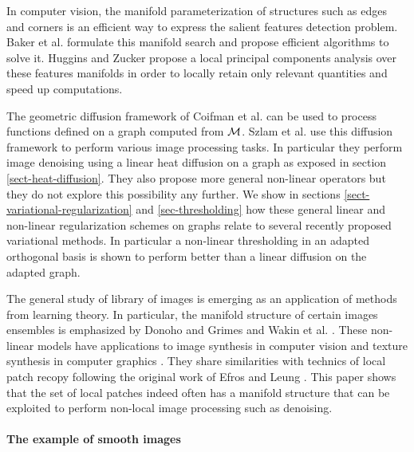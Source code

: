 \documentclass[final]{siamltex}
\begin{document}
In computer vision, the manifold parameterization of structures such as edges and corners is an efficient way to express the salient features detection  problem. Baker et al. \cite{baker-parametric} formulate this manifold search and propose efficient algorithms to solve it. Huggins and Zucker \cite{huggins-local-pca} propose a local principal components analysis over these features manifolds in order to locally retain only relevant quantities and speed up computations.

The geometric diffusion framework of Coifman et al. \cite{coifman-geometric-diffusion} can be used to process functions defined on a graph computed from $\mathcal{M}$. Szlam et al. \cite{szlam-regularization} use this diffusion framework to perform various image processing tasks. In particular they perform image denoising using a linear heat diffusion on a graph as exposed in section \ref{sect-heat-diffusion}. They also propose more general non-linear operators but they do not explore this possibility any further. We show in sections \ref{sect-variational-regularization} and \ref{sec-thresholding} how these general linear and non-linear regularization schemes on graphs relate to several recently proposed variational methods. In particular a non-linear thresholding in an adapted orthogonal basis is shown to perform better than a linear diffusion on the adapted graph.


The general study of library of images is emerging as an application of methods from learning theory. In particular, the manifold structure of certain images ensembles is emphasized by Donoho and Grimes \cite{donoho-isomap} and Wakin et al. \cite{wakin-multiscale-structure}. These non-linear models have applications to image synthesis in computer vision \cite{aharon-lips} and texture synthesis in computer graphics \cite{peyre-manifold,wang-appearance,matusik-texture-design}. They share similarities with technics of local patch recopy following the original work of Efros and Leung \cite{efros-nonparam-sampling}. This paper shows that the set of local patches indeed often has a manifold structure that can be exploited to perform non-local image processing such as denoising.


\paragraph{The example of smooth images}
\end{document}
